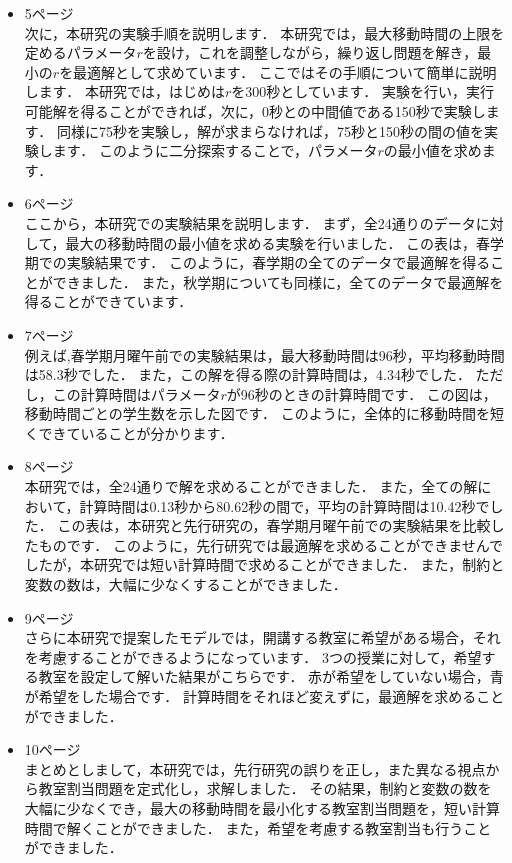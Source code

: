 \documentclass{jsarticle}
\begin{document}
\begin{itemize}
\item 5ページ\\
次に，本研究の実験手順を説明します．
本研究では，最大移動時間の上限を定めるパラメータ$r$を設け，これを調整しながら，繰り返し問題を解き，最小の$r$を最適解として求めています．
ここではその手順について簡単に説明します．
本研究では，はじめは$r$を300秒としています．
実験を行い，実行可能解を得ることができれば，次に，0秒との中間値である150秒で実験します．
同様に75秒を実験し，解が求まらなければ，75秒と150秒の間の値を実験します．
このように二分探索することで，パラメータ$r$の最小値を求めます．


\item 6ページ\\
ここから，本研究での実験結果を説明します．
まず，全24通りのデータに対して，最大の移動時間の最小値を求める実験を行いました．
この表は，春学期での実験結果です．
このように，春学期の全てのデータで最適解を得ることができました．
また，秋学期についても同様に，全てのデータで最適解を得ることができています．

\item 7ページ\\
例えば,春学期月曜午前での実験結果は，最大移動時間は96秒，平均移動時間は58.3秒でした．
また，この解を得る際の計算時間は，4.34秒でした．
ただし，この計算時間はパラメータ$r$が96秒のときの計算時間です．
この図は，移動時間ごとの学生数を示した図です．
このように，全体的に移動時間を短くできていることが分かります．

\item 8ページ\\
本研究では，全24通りで解を求めることができました．
また，全ての解において，計算時間は0.13秒から80.62秒の間で，平均の計算時間は10.42秒でした．
この表は，本研究と先行研究の，春学期月曜午前での実験結果を比較したものです．
このように，先行研究では最適解を求めることができませんでしたが，本研究では短い計算時間で求めることができました．
また，制約と変数の数は，大幅に少なくすることができました．

\item 9ページ\\
さらに本研究で提案したモデルでは，開講する教室に希望がある場合，それを考慮することができるようになっています．
3つの授業に対して，希望する教室を設定して解いた結果がこちらです．
赤が希望をしていない場合，青が希望をした場合です．
計算時間をそれほど変えずに，最適解を求めることができました．

\item 10ページ\\
まとめとしまして，本研究では，先行研究の誤りを正し，また異なる視点から教室割当問題を定式化し，求解しました．
その結果，制約と変数の数を大幅に少なくでき，最大の移動時間を最小化する教室割当問題を，短い計算時間で解くことができました．
また，希望を考慮する教室割当も行うことができました．


\end{itemize}
\end{document}
